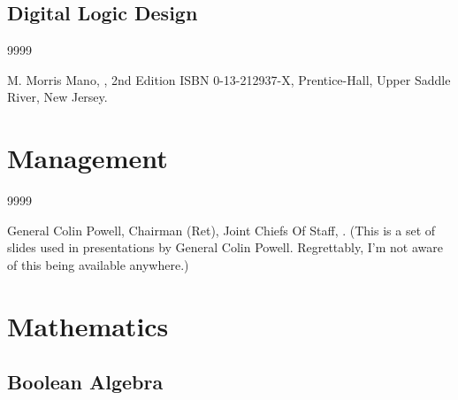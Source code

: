 \subsection*{Digital Logic Design}

\begin{thecustombibliography}{9999}

M. Morris Mano, 
, 2nd Edition
ISBN 0-13-212937-X, Prentice-Hall, Upper Saddle River, New Jersey.

\end{thecustombibliography}


\section*{Management}


\begin{thecustombibliography}{9999}

General Colin Powell, Chairman (Ret), Joint Chiefs Of Staff,
.
(This is a set of slides used in presentations by General
Colin Powell.  Regrettably, I'm not aware of this being
available anywhere.)

\end{thecustombibliography}



\section*{Mathematics}



\subsection*{Boolean Algebra}

